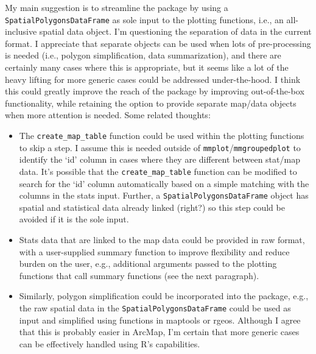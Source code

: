\documentclass[letterpaper,12pt]{article}\usepackage[]{graphicx}\usepackage[]{color}
\begin{document}
My main suggestion is to streamline the package by using a \texttt{SpatialPolygonsDataFrame} as sole input to the plotting functions, i.e., an all-inclusive spatial data object.  I'm questioning the separation of data in the current format.  I appreciate that separate objects can be used when lots of pre-processing is needed (i.e., polygon simplification, data summarization), and there are certainly many cases where this is appropriate, but it seems like a lot of the heavy lifting for more generic cases could be addressed under-the-hood.  I think this could greatly improve the reach of the package by improving out-of-the-box functionality, while retaining the option to provide separate map/data objects when more attention is needed.  Some related thoughts:
\begin{itemize}
\item The \texttt{create\_map\_table} function could be used within the plotting functions to skip a step.  I assume this is needed outside of \texttt{mmplot}/\texttt{mmgroupedplot} to identify the `id' column in cases where they are different between stat/map data.  It's possible that the \texttt{create\_map\_table} function can be modified to search for the `id' column automatically based on a simple matching with the columns in the stats input.  Further, a \texttt{SpatialPolygonsDataFrame} object has spatial and statistical data already linked (right?) so this step could be avoided if it is the sole input.
\item Stats data that are linked to the map data could be provided in raw format, with a user-supplied summary function to improve flexibility and reduce burden on the user, e.g., additional arguments passed to the plotting functions that call summary functions (see the next paragraph).
\item Similarly, polygon simplification could be incorporated into the package, e.g., the raw spatial data in the \texttt{SpatialPolygonsDataFrame} could be used as input and simplified using functions in maptools or rgeos.  Although I agree that this is probably easier in ArcMap, I'm certain that more generic cases can be effectively handled using R's capabilities.
\end{itemize}
\end{document}
